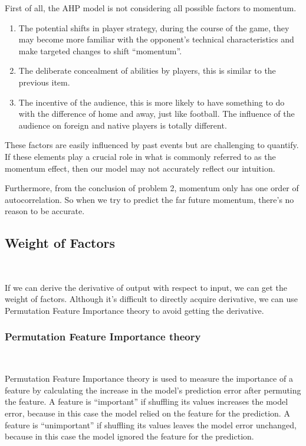 First of all, the AHP model is not considering all possible factors to momentum.

\begin{enumerate}
    \item The potential shifts in player strategy, during the course of the game, they may become more 
    familiar with the opponent's technical characteristics and make targeted changes to shift ``momentum''.
    \item The deliberate concealment of abilities by players, this is similar to the previous item.
    \item The incentive of the audience, this is more likely to have something to do with the difference of home and away,
    just like football. The influence of the audience on foreign and native players is totally different.
\end{enumerate}

These factors are easily influenced by past events but are challenging to quantify.
If these elements play a crucial role in what is commonly referred to as the momentum effect,
then our model may not accurately reflect our intuition.

Furthermore, from the conclusion of problem 2, momentum only has one order of autocorrelation.
So when we try to predict the far future momentum, there's no reason to be accurate.

\subsection{Weight of Factors}~{}

If we can derive the derivative of output with respect to input, we can get the weight of factors.
Although it's difficult to directly acquire derivative, we can use Permutation Feature Importance theory
to avoid getting the derivative.

\subsubsection{Permutation Feature Importance theory}~{}

Permutation Feature Importance theory is used to measure the importance of a feature by calculating 
the increase in the model's prediction error after permuting the feature. A feature is “important” if shuffling its values increases the model error, 
because in this case the model relied on the feature for the prediction. A feature is “unimportant” if 
shuffling its values leaves the model error unchanged, because in this case the model ignored the feature 
for the prediction. 

